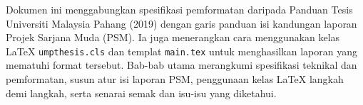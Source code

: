 \begin{abstrak}
Dokumen ini menggabungkan spesifikasi pemformatan daripada Panduan Tesis Universiti Malaysia Pahang (2019) dengan garis panduan isi kandungan laporan Projek Sarjana Muda (PSM). Ia juga menerangkan cara menggunakan kelas \LaTeX{} \texttt{umpthesis.cls} dan templat \texttt{main.tex} untuk menghasilkan laporan yang mematuhi format tersebut. Bab-bab utama merangkumi spesifikasi teknikal dan pemformatan, susun atur isi laporan PSM, penggunaan kelas \LaTeX{} langkah demi langkah, serta senarai semak dan isu-isu yang diketahui.
\end{abstrak}
